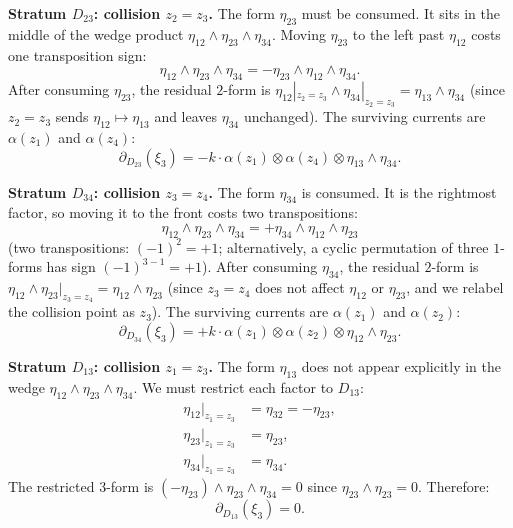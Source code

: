 \medskip
\noindent\textbf{Stratum $D_{23}$: collision $z_2 = z_3$.}
The form $\eta_{23}$ must be consumed. It sits in the middle
of the wedge product $\eta_{12} \wedge \eta_{23} \wedge \eta_{34}$.
Moving $\eta_{23}$ to the left past $\eta_{12}$ costs one
transposition sign:
\[
\eta_{12} \wedge \eta_{23} \wedge \eta_{34}
= -\eta_{23} \wedge \eta_{12} \wedge \eta_{34}.
\]
After consuming $\eta_{23}$, the residual $2$-form is
$\eta_{12}|_{z_2 = z_3} \wedge \eta_{34}|_{z_2 = z_3}
= \eta_{13} \wedge \eta_{34}$
(since $z_2 = z_3$ sends $\eta_{12} \mapsto \eta_{13}$
and leaves $\eta_{34}$ unchanged).
The surviving currents are $\alpha(z_1)$ and $\alpha(z_4)$:
\begin{equation}\label{eq:frame-D23-deg3}
\partial_{D_{23}}(\xi_3)
= -k \cdot \alpha(z_1) \otimes \alpha(z_4)
 \otimes \eta_{13} \wedge \eta_{34}.
\end{equation}

\medskip
\noindent\textbf{Stratum $D_{34}$: collision $z_3 = z_4$.}
The form $\eta_{34}$ is consumed. It is the rightmost factor,
so moving it to the front costs two transpositions:
\[
\eta_{12} \wedge \eta_{23} \wedge \eta_{34}
= +\eta_{34} \wedge \eta_{12} \wedge \eta_{23}
\]
(two transpositions: $(-1)^2 = +1$; alternatively, a cyclic
permutation of three $1$-forms has sign $(-1)^{3-1} = +1$).
After consuming $\eta_{34}$, the residual $2$-form is
$\eta_{12} \wedge \eta_{23}|_{z_3 = z_4}
= \eta_{12} \wedge \eta_{23}$
(since $z_3 = z_4$ does not affect $\eta_{12}$ or $\eta_{23}$,
and we relabel the collision point as $z_3$).
The surviving currents are $\alpha(z_1)$ and $\alpha(z_2)$:
\begin{equation}\label{eq:frame-D34-deg3}
\partial_{D_{34}}(\xi_3)
= +k \cdot \alpha(z_1) \otimes \alpha(z_2)
 \otimes \eta_{12} \wedge \eta_{23}.
\end{equation}

\medskip
\noindent\textbf{Stratum $D_{13}$: collision $z_1 = z_3$.}
The form $\eta_{13}$ does not appear explicitly in the wedge
$\eta_{12} \wedge \eta_{23} \wedge \eta_{34}$. We must restrict
each factor to $D_{13}$:
\begin{align*}
\eta_{12}\big|_{z_1 = z_3} &= \eta_{32} = -\eta_{23}, \\
\eta_{23}\big|_{z_1 = z_3} &= \eta_{23}, \\
\eta_{34}\big|_{z_1 = z_3} &= \eta_{34}.
\end{align*}
The restricted $3$-form is
$(-\eta_{23}) \wedge \eta_{23} \wedge \eta_{34}
= 0$
since $\eta_{23} \wedge \eta_{23} = 0$.
Therefore:
\begin{equation}\label{eq:frame-D13-deg3}
\partial_{D_{13}}(\xi_3) = 0.
\end{equation}

